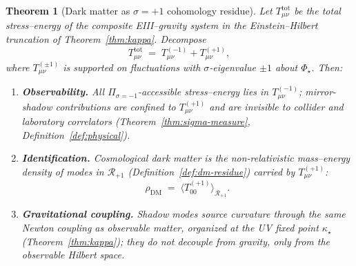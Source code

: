 \documentclass[aps,prd,onecolumn,amsmath,amssymb,nofootinbib,11pt]{revtex4-2}
\numberwithin{equation}{section}
\theoremstyle{plain}
\newtheorem{theorem}{Theorem}[section]
\theoremstyle{definition}
\theoremstyle{remark}
\newcommand{\orderparam}{\Phi}
\begin{document}
\begin{theorem}[Dark matter as $\sigma=+1$ cohomology residue]
\label{thm:dm-sector}
Let $T_{\mu\nu}^{\mathrm{tot}}$ be the total stress--energy of the composite
EIII--gravity system in the Einstein--Hilbert truncation of
Theorem~\ref{thm:kappa}. Decompose
\begin{equation}\label{eq:T-split}
  T_{\mu\nu}^{\mathrm{tot}}
  \;=\;
  T_{\mu\nu}^{(-1)}+T_{\mu\nu}^{(+1)},
\end{equation}
where $T_{\mu\nu}^{(\pm1)}$ is supported on fluctuations with
$\sigma$-eigenvalue $\pm1$ about $\orderparam_\star$.
Then:
\begin{enumerate}[label=(\roman*),leftmargin=*]
  \item \textbf{Observability.} All $\Pi_{\sigma=-1}$-accessible stress--energy
    lies in $T_{\mu\nu}^{(-1)}$; mirror-shadow contributions are confined to
    $T_{\mu\nu}^{(+1)}$ and are invisible to collider and laboratory correlators
    (Theorem~\ref{thm:sigma-measure}, Definition~\ref{def:physical}).
  \item \textbf{Identification.} Cosmological dark matter is the
    non-relativistic mass--energy density of modes in $\mathcal{R}_{+1}$
    (Definition~\ref{def:dm-residue}) carried by $T_{\mu\nu}^{(+1)}$:
    \begin{equation}\label{eq:dm-ident}
      \rho_{\mathrm{DM}}
      \;=\;
      \langle T_{00}^{(+1)}\rangle_{\mathcal{R}_{+1}}.
    \end{equation}
  \item \textbf{Gravitational coupling.} Shadow modes source curvature through
    the same Newton coupling as observable matter, organized at the UV fixed
    point $\kappa_\star$ (Theorem~\ref{thm:kappa}); they do not decouple from
    gravity, only from the observable Hilbert space.
\end{enumerate}
\end{theorem}
\end{document}

